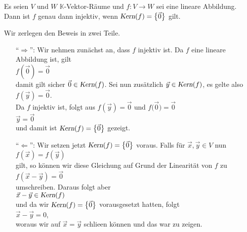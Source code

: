 \begin{Satz}
  Es seien $V$ und $W$ $\mathbb{K}$-Vektor-R\"{a}ume und $f:V \rightarrow W$ sei eine lineare Abbildung.
  Dann ist $f$ genau dann injektiv, wenn $\textsl{Kern}(f) = \bigl\{ \vec{0} \bigr\}$ gilt.
\end{Satz}

\proof
Wir zerlegen den Beweis in zwei Teile.
\begin{enumerate}
\item[``$\Rightarrow$'':] Wir nehmen zun\"{a}chst an, dass $f$ injektiv ist.  Da $f$ eine lineare Abbildung ist, gilt
      \\[0.2cm]
      \hspace*{1.3cm}
      $f(\vec{0}) = \vec{0}$
      \\[0.2cm]
      damit gilt sicher $\vec{0} \in \textsl{Kern}(f)$.  Sei nun zus\"{a}tzlich $\vec{y} \in \textsl{Kern}(f)$, es
      gelte also 
      \\[0.2cm]
      \hspace*{1.3cm}
      $f(\vec{y}) = \vec{0}$.
      \\[0.2cm]
      Da $f$ injektiv ist, folgt aus $f(\vec{y}) = \vec{0}$ und $f\bigl(\vec{0}\bigr) = \vec{0}$
      \\[0.2cm]
      \hspace*{1.3cm}
      $\vec{y} = \vec{0}$
      \\[0.2cm]
      und damit ist $\textsl{Kern}(f) = \bigl\{ \vec{0} \bigr\}$ gezeigt.
\item[``$\Leftarrow$'':] Wir setzen jetzt $\textsl{Kern}(f) = \bigl\{ \vec{0} \bigr\}$ voraus.  Falls f\"{u}r $\vec{x}, \vec{y} \in V$
      nun
      \\[0.2cm]
      \hspace*{1.3cm}
      $f(\vec{x}) = f(\vec{y})$
      \\[0.2cm]
      gilt, so k\"{o}nnen wir diese Gleichung auf Grund der Linearit\"{a}t von $f$ zu
      \\[0.2cm]
      \hspace*{1.3cm}
      $f(\vec{x} - \vec{y}) = \vec{0}$
      \\[0.2cm]
      umschreiben.  Daraus folgt aber
      \\[0.2cm]
      \hspace*{1.3cm}
      $\vec{x} - \vec{y} \in \textsl{Kern}(f)$
      \\[0.2cm]
      und da wir $\textsl{Kern}(f) = \bigl\{ \vec{0} \bigr\}$ vorausgesetzt hatten, folgt
      \\[0.2cm]
      \hspace*{1.3cm}
      $\vec{x} - \vec{y} = 0$,
      \\[0.2cm]
      woraus wir auf $\vec{x} = \vec{y}$ schlie\3en k\"{o}nnen und das war zu zeigen.  \qeds
\end{enumerate}

